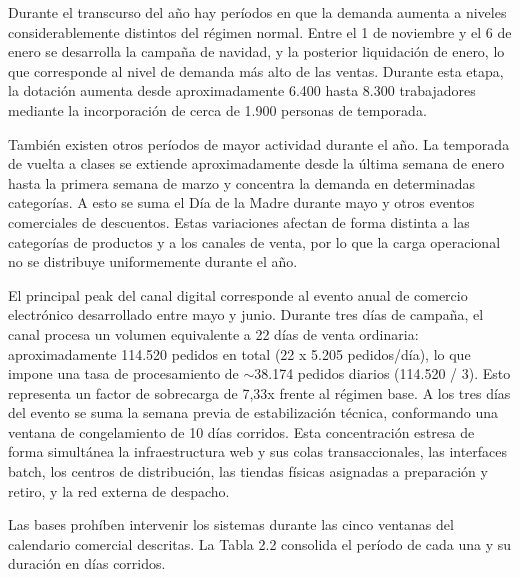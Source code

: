 \documentclass[11pt]{article}
\begin{document}
Durante el transcurso del año hay períodos en que la demanda aumenta a niveles considerablemente distintos del régimen normal. Entre el 1 de noviembre y el 6 de enero se desarrolla la campaña de navidad, y la posterior liquidación de enero, lo que corresponde al nivel de demanda más alto de las ventas. Durante esta etapa, la dotación aumenta desde aproximadamente 6.400 hasta 8.300 trabajadores mediante la incorporación de cerca de 1.900 personas de temporada.

También existen otros períodos de mayor actividad durante el año. La temporada de vuelta a clases se extiende aproximadamente desde la última semana de enero hasta la primera semana de marzo y concentra la demanda en determinadas categorías. A esto se suma el Día de la Madre durante mayo y otros eventos comerciales de descuentos. Estas variaciones afectan de forma distinta a las categorías de productos y a los canales de venta, por lo que la carga operacional no se distribuye uniformemente durante el año.

El principal peak del canal digital corresponde al evento anual de comercio electrónico desarrollado entre mayo y junio. Durante tres días de campaña, el canal procesa un volumen equivalente a 22 días de venta ordinaria: aproximadamente 114.520 pedidos en total (22 x 5.205 pedidos/día), lo que impone una tasa de procesamiento de $\sim$38.174 pedidos diarios (114.520 / 3). Esto representa un factor de sobrecarga de 7,33x frente al régimen base. A los tres días del evento se suma la semana previa de estabilización técnica, conformando una ventana de congelamiento de 10 días corridos. Esta concentración estresa de forma simultánea la infraestructura web y sus colas transaccionales, las interfaces batch, los centros de distribución, las tiendas físicas asignadas a preparación y retiro, y la red externa de despacho.

Las bases prohíben intervenir los sistemas durante las cinco ventanas del calendario comercial descritas. La Tabla 2.2 consolida el período de cada una y su duración en días corridos.
\end{document}
